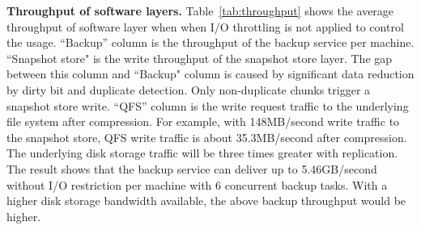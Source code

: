 {\bf Throughput of software layers.}
Table~\ref{tab:throughput} shows the  average throughput of software layer
when when I/O throttling is not applied to control the usage.
``Backup'' column is the throughput  of the backup service  per machine.
``Snapshot store" is the  write throughput of the snapshot store layer. The gap between this
column and  ``Backup" column is caused by significant data reduction by dirty bit and duplicate
detection. Only non-duplicate chunks trigger a snapshot store write.
``QFS'' column is the write request traffic to the underlying file system after compression.
For example, with 148MB/second write traffic to the snapshot store, QFS write traffic is about 35.3MB/second
after compression.  The underlying disk storage traffic will be three times greater with replication.
The result shows that the backup service can deliver up to 5.46GB/second without I/O restriction
per machine with 6 concurrent backup tasks. With a higher disk storage bandwidth available, the above backup
 throughput would be higher. 
 



